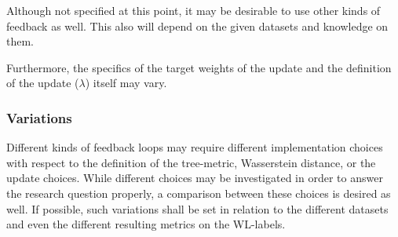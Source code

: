 Although not specified at this point, it may be desirable to use other kinds of feedback as well.
This also will depend on the given datasets and knowledge on them.

Furthermore, the specifics of the target weights of the update and the definition of the update ($\lambda$) itself may vary. 

\subsubsection{Variations}

Different kinds of feedback loops may require different implementation choices with respect to the definition of the tree-metric, Wasserstein distance, or the update choices. 
While different choices may be investigated in order to answer the research question properly, a comparison between these choices is desired as well.
If possible, such variations shall be set in relation to the different datasets and even the different resulting metrics on the WL-labels.





%
%


%
%
\newpage
\printbibliography


